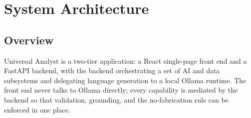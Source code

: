 \chapter{System Architecture}
\label{ch:arch}

\section{Overview}
Universal Analyst is a two-tier application: a React single-page front end and a
FastAPI backend, with the backend orchestrating a set of AI and data
subsystems and delegating language generation to a local Ollama runtime. The
front end never talks to Ollama directly; every capability is mediated by the
backend so that validation, grounding, and the no-fabrication rule can be
enforced in one place.


